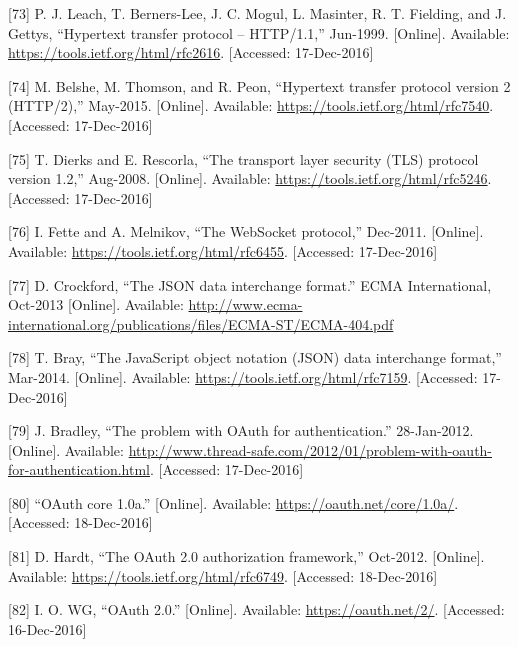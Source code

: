 \documentclass[12pt,english,a4paper,titlepage,cleardoublepage=empty,dottedtoc]{report}
\begin{document}
\hypertarget{ref-web_spec_http1}{}
{[}73{]} P. J. Leach, T. Berners-Lee, J. C. Mogul, L. Masinter, R. T.
Fielding, and J. Gettys, ``Hypertext transfer protocol -- HTTP/1.1,''
Jun-1999. {[}Online{]}. Available:
\url{https://tools.ietf.org/html/rfc2616}. {[}Accessed: 17-Dec-2016{]}

\hypertarget{ref-web_spec_http2}{}
{[}74{]} M. Belshe, M. Thomson, and R. Peon, ``Hypertext transfer
protocol version 2 (HTTP/2),'' May-2015. {[}Online{]}. Available:
\url{https://tools.ietf.org/html/rfc7540}. {[}Accessed: 17-Dec-2016{]}

\hypertarget{ref-web_spec_tls}{}
{[}75{]} T. Dierks and E. Rescorla, ``The transport layer security (TLS)
protocol version 1.2,'' Aug-2008. {[}Online{]}. Available:
\url{https://tools.ietf.org/html/rfc5246}. {[}Accessed: 17-Dec-2016{]}

\hypertarget{ref-web_spec_websockets}{}
{[}76{]} I. Fette and A. Melnikov, ``The WebSocket protocol,'' Dec-2011.
{[}Online{]}. Available: \url{https://tools.ietf.org/html/rfc6455}.
{[}Accessed: 17-Dec-2016{]}

\hypertarget{ref-web_spec_json}{}
{[}77{]} D. Crockford, ``The JSON data interchange format.'' ECMA
International, Oct-2013 {[}Online{]}. Available:
\url{http://www.ecma-international.org/publications/files/ECMA-ST/ECMA-404.pdf}

\hypertarget{ref-web_rfc_json}{}
{[}78{]} T. Bray, ``The JavaScript object notation (JSON) data
interchange format,'' Mar-2014. {[}Online{]}. Available:
\url{https://tools.ietf.org/html/rfc7159}. {[}Accessed: 17-Dec-2016{]}

\hypertarget{ref-web_2012_problem-with-oauth-for-authentication}{}
{[}79{]} J. Bradley, ``The problem with OAuth for authentication.''
28-Jan-2012. {[}Online{]}. Available:
\url{http://www.thread-safe.com/2012/01/problem-with-oauth-for-authentication.html}.
{[}Accessed: 17-Dec-2016{]}

\hypertarget{ref-web_spec_oauth-1a}{}
{[}80{]} ``OAuth core 1.0a.'' {[}Online{]}. Available:
\url{https://oauth.net/core/1.0a/}. {[}Accessed: 18-Dec-2016{]}

\hypertarget{ref-web_spec_oauth-2}{}
{[}81{]} D. Hardt, ``The OAuth 2.0 authorization framework,'' Oct-2012.
{[}Online{]}. Available: \url{https://tools.ietf.org/html/rfc6749}.
{[}Accessed: 18-Dec-2016{]}

\hypertarget{ref-web_2016_oauth-2}{}
{[}82{]} I. O. WG, ``OAuth 2.0.'' {[}Online{]}. Available:
\url{https://oauth.net/2/}. {[}Accessed: 16-Dec-2016{]}
\end{document}

